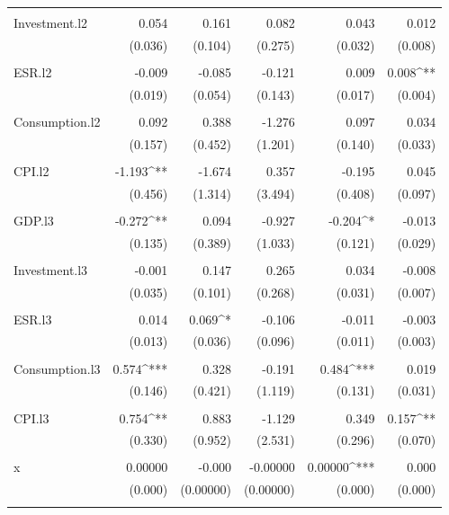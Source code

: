 \begin{table}[!htbp]
\begin{tabular}{@{\extracolsep{5pt}}lD{.}{.}{-3} D{.}{.}{-3} D{.}{.}{-3} D{.}{.}{-3} D{.}{.}{-3} }
  & & & & & \\ 
 Investment.l2 & 0.054 & 0.161 & 0.082 & 0.043 & 0.012 \\ 
  & (0.036) & (0.104) & (0.275) & (0.032) & (0.008) \\ 
  & & & & & \\ 
 ESR.l2 & -0.009 & -0.085 & -0.121 & 0.009 & 0.008^{**} \\ 
  & (0.019) & (0.054) & (0.143) & (0.017) & (0.004) \\ 
  & & & & & \\ 
 Consumption.l2 & 0.092 & 0.388 & -1.276 & 0.097 & 0.034 \\ 
  & (0.157) & (0.452) & (1.201) & (0.140) & (0.033) \\ 
  & & & & & \\ 
 CPI.l2 & -1.193^{**} & -1.674 & 0.357 & -0.195 & 0.045 \\ 
  & (0.456) & (1.314) & (3.494) & (0.408) & (0.097) \\ 
  & & & & & \\ 
 GDP.l3 & -0.272^{**} & 0.094 & -0.927 & -0.204^{*} & -0.013 \\ 
  & (0.135) & (0.389) & (1.033) & (0.121) & (0.029) \\ 
  & & & & & \\ 
 Investment.l3 & -0.001 & 0.147 & 0.265 & 0.034 & -0.008 \\ 
  & (0.035) & (0.101) & (0.268) & (0.031) & (0.007) \\ 
  & & & & & \\ 
 ESR.l3 & 0.014 & 0.069^{*} & -0.106 & -0.011 & -0.003 \\ 
  & (0.013) & (0.036) & (0.096) & (0.011) & (0.003) \\ 
  & & & & & \\ 
 Consumption.l3 & 0.574^{***} & 0.328 & -0.191 & 0.484^{***} & 0.019 \\ 
  & (0.146) & (0.421) & (1.119) & (0.131) & (0.031) \\ 
  & & & & & \\ 
 CPI.l3 & 0.754^{**} & 0.883 & -1.129 & 0.349 & 0.157^{**} \\ 
  & (0.330) & (0.952) & (2.531) & (0.296) & (0.070) \\ 
  & & & & & \\ 
 x & 0.00000 & -0.000 & -0.00000 & 0.00000^{***} & 0.000 \\ 
  & (0.000) & (0.00000) & (0.00000) & (0.000) & (0.000) \\ 
  & & & & & \\ 

\end{tabular}
\end{table}

